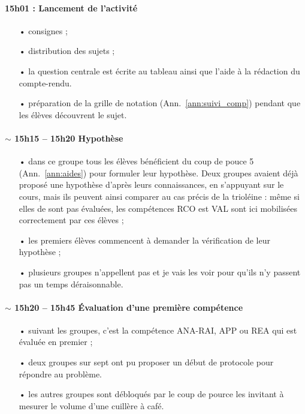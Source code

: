 \documentclass[12pt,a4paper, fleqn]{report}
\newcommand{\app}{\colorbox{bleu_c}{\textcolor{bleu_f}{APP}}}
\newcommand{\rea}{\colorbox{yellow_c}{\textcolor{yellow_f}{REA}}}
\newcommand{\anarai}{\colorbox{green_c}{\textcolor{green_f}{ANA-RAI}}}
\newcommand{\val}{\colorbox{orange_c}{\textcolor{orange_f}{VAL}}}
\newcommand{\rco}{\colorbox{gray_c}{\textcolor{gray_f}{RCO}}}
\begin{document}
\paragraph{15h01 : Lancement de l'activité}
\begin{itemize}
\item[•] consignes ;
\item[•] distribution des sujets ;
\item[•] la question centrale est écrite au tableau ainsi que l'aide à la rédaction du compte-rendu.
\item[•] préparation de la grille de notation (Ann.~\ref{ann:suivi_comp}) pendant que les élèves découvrent le sujet.
\end{itemize}

\paragraph{$\sim$ 15h15 -- 15h20 Hypothèse}
\begin{itemize}
\item[•] dans ce groupe tous les élèves bénéficient du coup de pouce 5 (Ann.~\ref{ann:aides}) pour formuler leur hypothèse.
Deux groupes avaient déjà proposé une hypothèse d'après leurs connaissances, en s'appuyant sur le cours, mais ils peuvent ainsi comparer au cas précis de la trioléine : même si elles de sont pas évaluées, les compétences \rco{} est \val{} sont ici mobilisées correctement par ces élèves ;
\item[•] les premiers élèves commencent à demander la vérification de leur hypothèse ;
\item[•] plusieurs groupes n'appellent pas et je vais les voir pour qu'ils n'y passent pas un temps déraisonnable.
\end{itemize}

\paragraph{$\sim$ 15h20 -- 15h45 Évaluation d'une première compétence}
\begin{itemize}
\item[•] suivant les groupes, c'est la compétence \anarai{}, \app{} ou \rea{} qui est évaluée en premier ;
\item[•] deux groupes sur sept ont pu proposer un début de protocole pour répondre au problème.
\item[•] les autres groupes sont débloqués par le coup de pource les invitant à mesurer le volume d'une cuillère à café.
\end{itemize}
\end{document}
